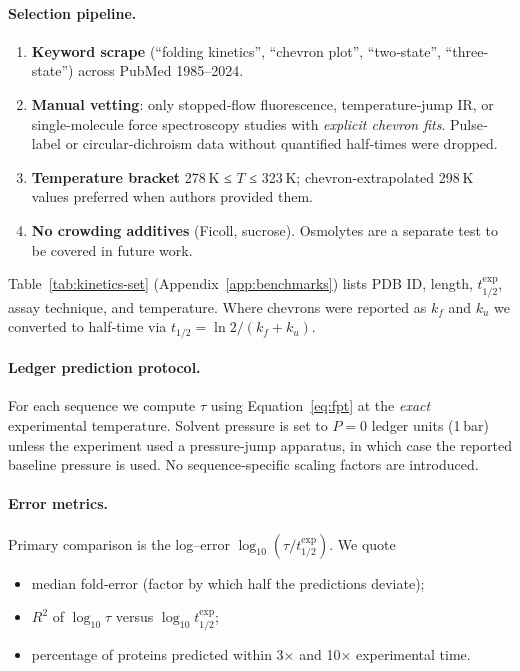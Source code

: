 \documentclass[11pt]{article}
\begin{document}
\paragraph{Selection pipeline.}
\begin{enumerate}\setlength\itemsep{2pt}
\item \textbf{Keyword scrape} (“folding kinetics”, “chevron plot”,
      “two‐state”, “three‐state”) across PubMed 1985–2024.
\item \textbf{Manual vetting}: only stopped‐flow fluorescence,
      temperature‐jump IR, or single‐molecule force spectroscopy
      studies with \emph{explicit chevron fits}.  Pulse‐label or
      circular‐dichroism data without quantified half‐times were
      dropped.
\item \textbf{Temperature bracket} 278 K ≤ $T$ ≤ 323 K; chevron‐extrapolated
      298 K values preferred when authors provided them.
\item \textbf{No crowding additives} (Ficoll, sucrose).  Osmolytes are
      a separate test to be covered in future work.
\end{enumerate}

Table~\ref{tab:kinetics-set} (Appendix~\ref{app:benchmarks}) lists PDB
ID, length, $t_{1/2}^{\mathrm{exp}}$, assay technique, and temperature.
Where chevrons were reported as $k_{f}$ and $k_{u}$ we converted to
half‐time via
$t_{1/2}= \ln 2 /(k_{f}+k_{u})$.

\paragraph{Ledger prediction protocol.}
For each sequence we compute $\tau$ using Equation~\eqref{eq:fpt} at the
\emph{exact} experimental temperature.  Solvent pressure is set to
$P=0$ ledger units (1 bar) unless the experiment used a pressure‐jump
apparatus, in which case the reported baseline pressure is used.  No
sequence‐specific scaling factors are introduced.

\paragraph{Error metrics.}
Primary comparison is the log–error
$\log_{10}(\tau / t_{1/2}^{\mathrm{exp}})$.  We quote

\begin{itemize}\setlength\itemsep{2pt}
\item median fold‐error (factor by which half the predictions deviate);
\item $R^{2}$ of $\log_{10}\tau$ versus $\log_{10}t_{1/2}^{\mathrm{exp}}$;
\item percentage of proteins predicted within 3× and 10× experimental time.
\end{itemize}
\end{document}

